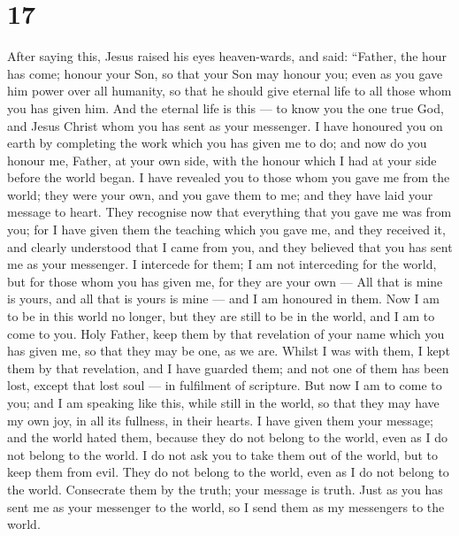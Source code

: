 \hypertarget{section-16}{%
\section{17}\label{section-16}}

 After saying this, Jesus raised his eyes heaven-wards, and
said: ``Father, the hour has come; honour your Son, so that your Son may
honour you;  even as you gave him power over all humanity,
so that he should give eternal life to all those whom you has given him.
 And the eternal life is this --- to know you the one true
God, and Jesus Christ whom you has sent as your messenger. 
I have honoured you on earth by completing the work which you has given
me to do;  and now do you honour me, Father, at your own
side, with the honour which I had at your side before the world began.
 I have revealed you to those whom you gave me from the
world; they were your own, and you gave them to me; and they have laid
your message to heart.  They recognise now that everything
that you gave me was from you;  for I have given them the
teaching which you gave me, and they received it, and clearly understood
that I came from you, and they believed that you has sent me as your
messenger.  I intercede for them; I am not interceding for
the world, but for those whom you has given me, for they are your own
---  All that is mine is yours, and all that is yours is
mine --- and I am honoured in them.  Now I am to be in this
world no longer, but they are still to be in the world, and I am to come
to you. Holy Father, keep them by that revelation of your name which you
has given me, so that they may be one, as we are.  Whilst I
was with them, I kept them by that revelation, and I have guarded them;
and not one of them has been lost, except that lost soul --- in
fulfilment of scripture.  But now I am to come to you; and
I am speaking like this, while still in the world, so that they may have
my own joy, in all its fullness, in their hearts.  I have
given them your message; and the world hated them, because they do not
belong to the world, even as I do not belong to the world. 
I do not ask you to take them out of the world, but to keep them from
evil.  They do not belong to the world, even as I do not
belong to the world.  Consecrate them by the truth; your
message is truth.  Just as you has sent me as your
messenger to the world, so I send them as my messengers to the world.
